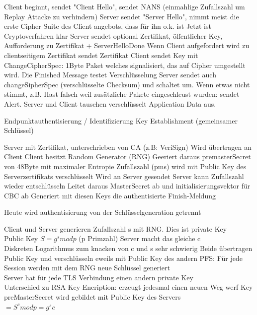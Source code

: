 \documentclass[ngerman,a4paper,12pt]{scrreprt}
\begin{document}
\ol
	\li Client beginnt, sendet "Client Hello", sendet NANS (einmahlige Zufallszahl um Replay Attacke zu verhindern)
	\li Server sendet "Server Hello", nimmt meist die erste Cipher Suite des Client angebots, dass für ihn o.k. ist
	\li Jetzt ist Cryptoverfahren klar
	\li Server sendet optional Zertifikat, öffentlicher Key, Aufforderung zu Zertifikat + ServerHelloDone
	\li Wenn Client aufgefordert wird zu clientseitigem Zertifikat \ra sendet Zertifikat
	\li Client sendet Key mit
	\li ChangeCipherSpec: 1Byte Paket welches signalisiert, das auf Cipher umgestellt wird. Die Finished Message testet Verschlüsselung
	\li Server sendet auch changeSipherSpec (verschlüsselte Checksum) und schaltet um. Wenn etwas nicht stimmt, z.B. Hast falsch weil zusätzliche Pakete eingeschleust wurden: sendet Alert.
	\li Server und Client tauschen verschlüsselt Application Data aus.
\olE

\ul
	\li Endpunktauthentisierung / Identifizierung
	\li Key Establishment (gemeinsamer Schlüssel)
\ulE

\ol
	\li Server mit Zertifikat, unterschrieben von CA (z.B: VeriSign)
	\li Wird übertragen an Client
	\li Client besitzt Random Generator (RNG)
	\li Geeriert daraus premasterSecret von 48Byte mit maximaler Entropie
	\li Zufallszahl (pms) wird mit Public Key des Serverzertifikats verschlüsselt
	\li Wird an Server gesendet
	\li Server kann Zufallszahl wieder entschlüsseln
	\li Leitet daraus MasterSecret ab und initialisierungsvektor für CBC ab
	\li Generiert mit diesen Keys die authentisierte Finish-Meldung
\olE
{}


\ul
	\li Heute wird authentisierung von der Schlüsselgeneration getrennt
\ulE

\ul
	\li Client und Server generieren Zufallszahl s mit RNG. Dies ist private Key
	\\ Public Key $S = g^s mod p$ (p Primzahl)
	\li Server macht das gleiche \ra c
	\\ \ra Diskreten Logarithmus zum knacken von c und s sehr schwierig
	\li Beide übertragen Public Key und verschlüsseln eweils mit Public Key des andern
	\li PFS: Für jede Session werden mit dem RNG neue Schlüssel generiert\\
	Server hat für jede TLS Verbindung einen andern private Key
	\\ \ra Unterschied zu RSA Key Encription: erzeugt jedesmal einen neuen Weg werf Key
	\li preMasterSecret wird gebildet mit Public Key des Servers \\
	$= S^cmod p = g^sc$
\ulE
\end{document}
